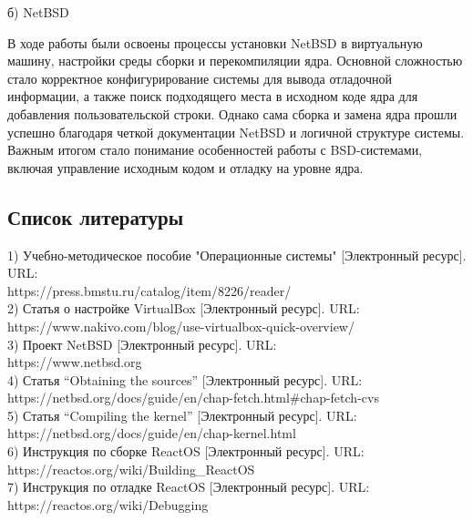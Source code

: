 \documentclass[a4paper, 14pt]{extarticle}
\begin{document}
\begin{center}
б) NetBSD
\end{center}
В ходе работы были освоены процессы установки NetBSD в виртуальную машину, настройки среды сборки и перекомпиляции ядра. Основной сложностью стало корректное конфигурирование системы для вывода отладочной информации, а также поиск подходящего места в исходном коде ядра для добавления пользовательской строки. Однако сама сборка и замена ядра прошли успешно благодаря четкой документации NetBSD и логичной структуре системы. Важным итогом стало понимание особенностей работы с BSD-системами, включая управление исходным кодом и отладку на уровне ядра.


\begin{center}
\section{Список литературы}
\end{center}
1) Учебно-методическое пособие "Операционные системы" [Электронный ресурс]. URL:\\
https://press.bmstu.ru/catalog/item/8226/reader/\\
2) Статья о настройке VirtualBox [Электронный ресурс]. URL:\\
https://www.nakivo.com/blog/use-virtualbox-quick-overview/\\
3) Проект NetBSD [Электронный ресурс]. URL:\\
https://www.netbsd.org\\
4) Статья “Obtaining the sources” [Электронный ресурс]. URL:\\
https://netbsd.org/docs/guide/en/chap-fetch.html\#chap-fetch-cvs\\
5) Статья “Compiling the kernel” [Электронный ресурс]. URL:\\
https://netbsd.org/docs/guide/en/chap-kernel.html\\
6) Инструкция по сборке ReactOS [Электронный ресурс]. URL:\\
https://reactos.org/wiki/Building\_ReactOS\\
7) Инструкция по отладке ReactOS [Электронный ресурс]. URL:\\
https://reactos.org/wiki/Debugging\\
\end{document}
